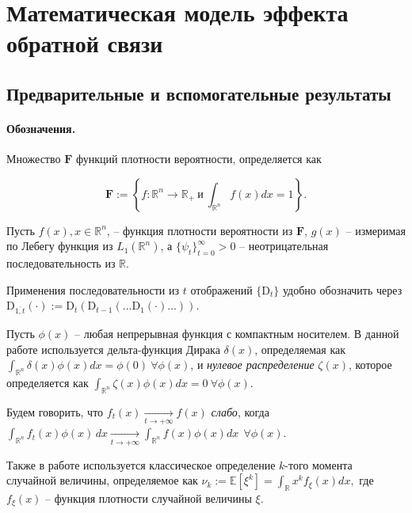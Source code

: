 \section{Математическая модель эффекта обратной связи}
    \subsection{Предварительные и вспомогательные результаты}
    \paragraph{Обозначения.}
        Множество $\textbf{F}$ функций плотности вероятности, определяется как

        \begin{equation} \label{R}
            \textbf{F} := \left\{f : \mathbb{R}^n \rightarrow \mathbb{R}_+ ~\text{и}~ \int_{\mathbb{R}^n}f(x)dx = 1\right\}.
        \end{equation}
        
        Пусть $f(x), x \in \mathbb{R}^n$, -- функция плотности вероятности из $\textbf{F}$, $g(x)$ -- измеримая по Лебегу функция из $L_1(\mathbb{R}^n)$, а $\{\psi_t\}_{t = 0}^{\infty} > 0$ -- неотрицательная последовательность из $\mathbb{R}$. 

        Применения последовательности из $t$ отображений $\{\text{D}_t\}$ удобно обозначить через $\text{D}_{\overline{1, t}}(\cdot) := \text{D}_t(\text{D}_{t-1} ( ... \text{D}_1( \cdot ) ... ))$.

        Пусть $\phi(x)$ -- любая непрерывная функция с компактным носителем. В данной работе используется дельта-функция Дирака $\delta(x)$, определяемая как 
        $
           \int_{\mathbb{R}^n} \delta(x) \phi(x) dx =  \phi(0) ~ \forall \phi(x)
        $, и \emph{нулевое распределение} $\zeta(x)$, которое определяется как
        $
        \int_{\mathbb{R}^n} \zeta(x) \phi(x) dx =  0 ~ \forall \phi(x).
        $

        Будем говорить, что $f_t(x) \underset{t \to +\infty}{\longrightarrow} f(x)$ \emph{слабо}, когда 
        $
            \int_{\mathbb{R}^n} f_t(x) \phi(x) \, dx \underset{t \to +\infty}{\longrightarrow} \int_{\mathbb{R}^n} f(x) \phi(x) dx ~~ \forall \phi(x).
        $

        Также в работе используется классическое определение $k$-того момента случайной величины, определяемое как 
        $
        \nu_{k} := \mathbb{E}[\xi^k] = \int_{\mathbb{R}} x^{k} f_{\xi}(x) dx,
        $
        где $f_{\xi}(x)$ -- функция плотности случайной величины $\xi$.

